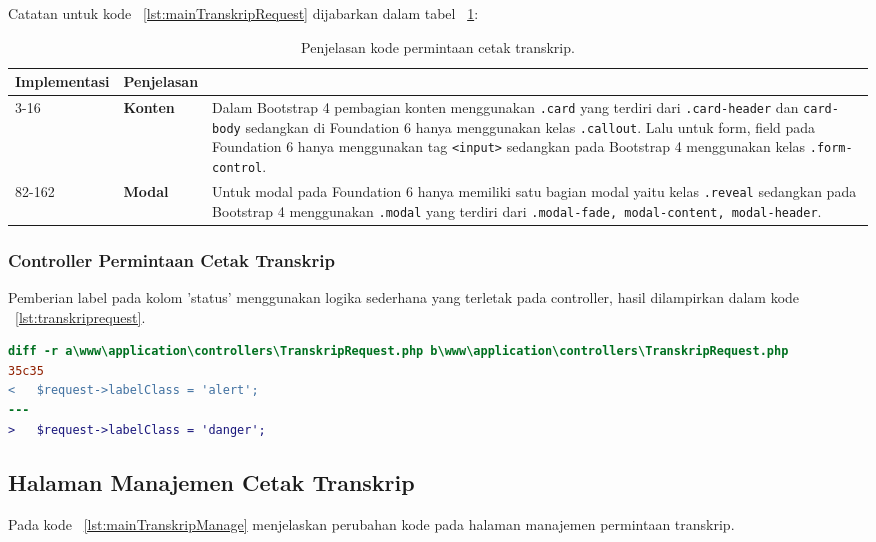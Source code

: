 \noindent Catatan untuk kode ~\ref{lst:mainTranskripRequest} dijabarkan dalam tabel ~\ref{table:kodePermintaanCetakTranskrip}:
\begin{table}[H]
	\centering
	\begin{tabularx}{\textwidth}{llX}
		\toprule
		Implementasi     & Penjelasan \\
		\midrule
		3-16 & \textbf{Konten} & Dalam Bootstrap 4 pembagian konten menggunakan \texttt{.card} yang terdiri dari \texttt{.card-header} dan \texttt{card-body} sedangkan di Foundation 6 hanya menggunakan kelas \texttt{.callout}. Lalu untuk form, field pada Foundation 6 hanya menggunakan tag \texttt{<input>} sedangkan pada Bootstrap 4 menggunakan kelas \texttt{.form-control}.\\
		82-162 & \textbf{Modal} & Untuk modal pada Foundation 6 hanya memiliki satu bagian modal yaitu kelas \texttt{.reveal} sedangkan pada Bootstrap 4 menggunakan \texttt{.modal} yang terdiri dari \texttt{.modal-fade, modal-content, modal-header}.\\
		\bottomrule
	\end{tabularx}%
	\caption{Penjelasan kode permintaan cetak transkrip.}
	\label{table:kodePermintaanCetakTranskrip}
\end{table}

\subsubsection{Controller Permintaan Cetak Transkrip}
Pemberian label pada kolom 'status' menggunakan logika sederhana yang terletak pada controller, hasil dilampirkan dalam kode ~\ref{lst:transkriprequest}.
\begin{lstlisting}[language=diff, caption=Perubahan file \www\application\controllers\TranskripRequest.php,  basicstyle=\ttfamily, frame=single,
columns=fullflexible, keepspaces=true, breaklines=true, label={lst:transkriprequest}]
diff -r a\www\application\controllers\TranskripRequest.php b\www\application\controllers\TranskripRequest.php
35c35
<   $request->labelClass = 'alert';
---
>   $request->labelClass = 'danger';
\end{lstlisting}

\subsection{Halaman Manajemen Cetak Transkrip} 
Pada kode ~\ref{lst:mainTranskripManage} menjelaskan perubahan kode pada halaman manajemen permintaan transkrip.

